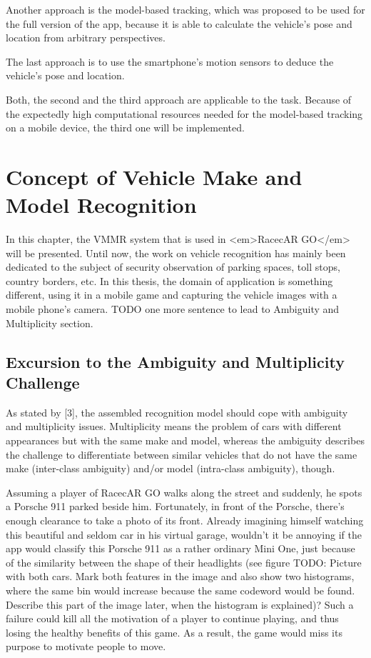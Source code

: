 Another approach is the model-based tracking, which was proposed to be used for the full version of the app, because it is able to calculate the vehicle’s pose and location from arbitrary perspectives.

The last approach is to use the smartphone’s motion sensors to deduce the vehicle’s pose and location.

Both, the second and the third approach are applicable to the task. Because of the expectedly high computational resources needed for the model-based tracking on a mobile device, the third one will be implemented.


\section{Concept of Vehicle Make and Model Recognition}\label{sec:vmmrConcept}
In this chapter, the VMMR system that is used in <em>RacecAR GO</em> will be presented. Until now, the work on vehicle recognition has mainly been dedicated to the subject of security observation of parking spaces, toll stops, country borders, etc. In this thesis, the domain of application is something different, using it in a mobile game and capturing the vehicle images with a mobile phone's camera.
TODO one more sentence to lead to Ambiguity and Multiplicity section.

\subsection{Excursion to the Ambiguity and Multiplicity Challenge}
As stated by [3], the assembled recognition model should cope with ambiguity and multiplicity issues. Multiplicity means the problem of cars with different appearances but with the same make and model, whereas the ambiguity describes the challenge to differentiate between similar vehicles that do not have the same make (inter-class ambiguity) and/or model (intra-class ambiguity), though.

Assuming a player of RacecAR GO walks along the street and suddenly, he spots a Porsche 911 parked beside him. Fortunately, in front of the Porsche, there's enough clearance to take a photo of its front. Already imagining himself watching this beautiful and seldom car in his virtual garage, wouldn't it be annoying if the app would classify this Porsche 911 as a rather ordinary Mini One, just because of the similarity between the shape of their headlights (see figure TODO: Picture with both cars. Mark both features in the image and also show two histograms, where the same bin would increase because the same codeword would be found. Describe this part of the image later, when the histogram is explained)? Such a failure could kill all the motivation of a player to continue playing, and thus losing the healthy benefits of this game. As a result, the game would miss its purpose to motivate people to move.

